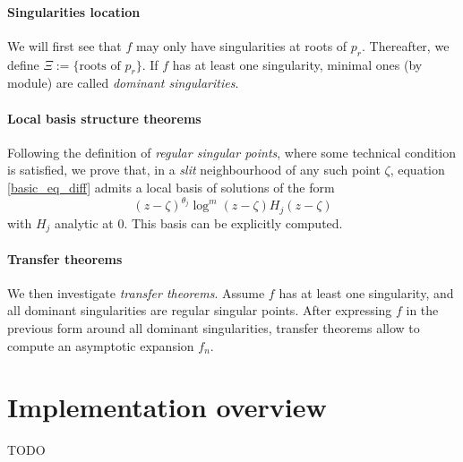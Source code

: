 \documentclass[../main.tex]{subfiles}
\begin{document}
\paragraph*{Singularities location}
We will first see that $f$ may only have singularities at roots of $p_r$. Thereafter, we define $\Xi := \{ \text{roots of } p_r\}$. If $f$ has at least one singularity, minimal ones (by module) are called \emph{dominant singularities}.

\paragraph*{Local basis structure theorems}
Following the definition of \emph{regular singular points}, where some technical condition is satisfied, we prove that, in a \emph{slit} neighbourhood of any such point $\zeta$, equation \ref{basic_eq_diff} admits a local basis of solutions of the form $${(z - \zeta)}^{\theta_j} \log^m (z - \zeta) H_j (z - \zeta)$$ with $H_j$ analytic at 0. This basis can be explicitly computed. 

\paragraph*{Transfer theorems}
We then investigate \emph{transfer theorems}. Assume $f$ has at least one singularity, and  all dominant singularities are regular singular points. After expressing $f$ in the previous form around all dominant singularities, transfer theorems allow to compute an asymptotic expansion $f_n$.


\section{Implementation overview}

TODO
\end{document}
